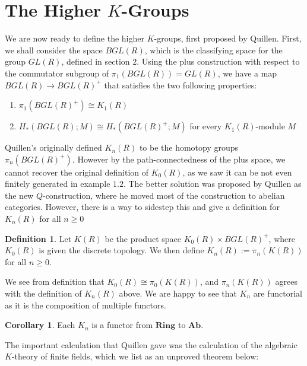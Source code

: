 \documentclass{article}
\theoremstyle{definition}
\theoremstyle{definition}
\newtheorem{definition}{Definition}[theorem]
\theoremstyle{definition}
\theoremstyle{definition}
\theoremstyle{definition}
\theoremstyle{definition}
\newtheorem{corollary}{Corollary}[theorem]
\theoremstyle{definition}
\begin{document}
\section{The Higher $K$-Groups}
We are now ready to define the higher $K$-groups, first proposed by Quillen. First, we shall consider the space $BGL(R)$, which is the classifying space for the group $GL(R)$, defined in section $2$. Using the plus construction with respect to the commutator subgroup of $\pi_1(BGL(R))=GL(R)$, we have a map $BGL(R)\xrightarrow{}BGL(R)^+$ that satisfies the two following properties:
\begin{enumerate}
    \item $\pi_1(BGL(R)^+)\cong K_1(R)$
    \item $H_*(BGL(R);M)\cong H_*(BGL(R)^+;M)$ for every $K_1(R)$-module $M$
\end{enumerate}
Quillen's originally defined $K_n(R)$ to be the homotopy groups $\pi_n(BGL(R)^+)$. However by the path-connectedness of the plus space, we cannot recover the original definition of $K_0(R)$, as we saw it can be not even finitely generated in example $1.2$. The better solution was proposed by Quillen as the new $Q$-construction, where he moved most of the construction to abelian categories. However, there is a way to sidestep this and give a definition for $K_n(R)$ for all $n\geq 0$

\begin{tcolorbox}[colback=purple!5!white,colframe=purple!75!black]
\begin{definition}
    Let $K(R)$ be the product space $K_0(R)\times BGL(R)^+$, where $K_0(R)$ is given the discrete topology. We then define $K_n(R):=\pi_n(K(R))$ for all $n\geq 0$.
\end{definition}
\end{tcolorbox}
We see from definition that $K_0(R)\cong \pi_0(K(R))$, and $\pi_n(K(R))$ agrees with the definition of $K_n(R)$ above. We are happy to see that $K_n$ are functorial as it is the composition of multiple functors.

\begin{tcolorbox}[colback=green!5!white,colframe=green!30!white]
\begin{corollary}
    Each $K_n$ is a functor from $\textbf{Ring}$ to $\textbf{Ab}$.
\end{corollary}
\end{tcolorbox}

The important calculation that Quillen gave was the calculation of the algebraic $K$-theory of finite fields, which we list as an unproved theorem below:
\end{document}
